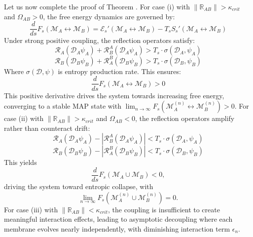 \begin{theorem} \label{theorem:bk5_enhanced_map_mad_duality_pr} 

Let us now complete the proof of Theorem .
For case (i) with $\|\mathbb{R}_{AB}\| > \kappa_{crit}$ and $\Omega_{AB} > 0$, the free energy dynamics are governed by:
\begin{equation}
\frac{d}{ds}F_s(\mathscr{M}_A \leftrightarrow \mathscr{M}_B) = \mathcal{E}_s'(\mathscr{M}_A \leftrightarrow \mathscr{M}_B) - T_s S_s'(\mathscr{M}_A \leftrightarrow \mathscr{M}_B)
\end{equation}
Under strong positive coupling, the reflection operators satisfy:
\begin{equation}
\mathcal{R}_A(\mathcal{D}_A \psi_A) + \mathcal{R}_B^A(\mathcal{D}_A \psi_A) > T_s \cdot \sigma(\mathcal{D}_A, \psi_A)
\end{equation}
\begin{equation}
\mathcal{R}_B(\mathcal{D}_B \psi_B) + \mathcal{R}_A^B(\mathcal{D}_B \psi_B) > T_s \cdot \sigma(\mathcal{D}_B, \psi_B)
\end{equation}
Where $\sigma(\mathcal{D}, \psi)$ is entropy production rate. This ensures:
\begin{equation}
\frac{d}{ds}F_s(\mathscr{M}_A \leftrightarrow \mathscr{M}_B) > 0
\end{equation}
This positive derivative drives the system towards increasing free energy, converging to a stable MAP state with $\lim_{n \to \infty} F_s(\mathscr{M}_A^{(n)} \leftrightarrow \mathscr{M}_B^{(n)}) > 0$.
For case (ii) with $\|\mathbb{R}_{AB}\| > \kappa_{crit}$ and $\Omega_{AB} < 0$, the reflection operators amplify rather than counteract drift:
\begin{equation}
\mathcal{R}_A(\mathcal{D}_A \psi_A) - |\mathcal{R}_B^A(\mathcal{D}_A \psi_A)| < T_s \cdot \sigma(\mathcal{D}_A, \psi_A)
\end{equation}
\begin{equation}
\mathcal{R}_B(\mathcal{D}_B \psi_B) - |\mathcal{R}_A^B(\mathcal{D}_B \psi_B)| < T_s \cdot \sigma(\mathcal{D}_B, \psi_B)
\end{equation}
This yields
\[
\frac{d}{ds} F_s(\mathscr{M}_A \cup \mathscr{M}_B) < 0,
\]
driving the system toward entropic collapse, with
\[
\lim_{n \to \infty} F_s(\mathscr{M}_A^{(n)} \cup \mathscr{M}_B^{(n)}) = 0.
\]
For case (iii) with $\|\mathbb{R}_{AB}\| < \kappa_{crit}$, the coupling is insufficient to create meaningful interaction effects, leading to asymptotic decoupling where each membrane evolves nearly independently, with diminishing interaction term $\epsilon_n$.
\end{theorem}
